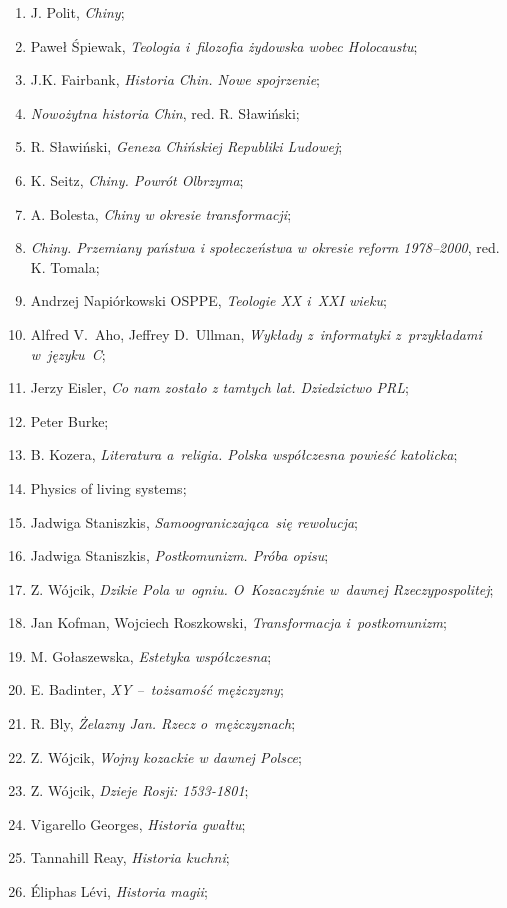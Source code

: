 \documentclass[a4paper,11pt]{article}
\begin{document}
\begin{enumerate}
\item J. Polit, \emph{Chiny};
\item Paweł Śpiewak, \emph{Teologia i~filozofia żydowska wobec
    Holocaustu};
\item J.K. Fairbank, \emph{Historia Chin. Nowe spojrzenie};
\item \emph{Nowożytna historia Chin}, red. R. Sławiński;
\item R. Sławiński, \emph{Geneza Chińskiej Republiki Ludowej};
\item K. Seitz, \emph{Chiny. Powrót Olbrzyma};
\item A. Bolesta, \emph{Chiny w okresie transformacji};
\item \emph{Chiny. Przemiany państwa i społeczeństwa w okresie reform
    1978--2000}, red. K. Tomala;
\item Andrzej Napiórkowski OSPPE, \emph{Teologie XX i~XXI wieku};
\item Alfred V.~Aho, Jeffrey D.~Ullman, \emph{Wykłady z~informatyki
    z~przykładami w~języku~C};
\item Jerzy Eisler, \emph{Co nam zostało z tamtych lat. Dziedzictwo
    PRL};
\item Peter Burke;
\item B. Kozera, \emph{Literatura a~religia. Polska współczesna
    powieść katolicka};
\item Physics of living systems;
\item Jadwiga Staniszkis, \emph{Samoograniczająca~się rewolucja};
\item Jadwiga Staniszkis, \emph{Postkomunizm. Próba opisu};
\item Z. Wójcik, \emph{Dzikie Pola w~ogniu. O~Kozaczyźnie w~dawnej
    Rzeczypospolitej};
\item Jan Kofman, Wojciech Roszkowski, \emph{Transformacja
    i~postkomunizm};
\item M. Gołaszewska, \emph{Estetyka współczesna};
\item E. Badinter, \emph{XY --~tożsamość mężczyzny};
\item R. Bly, \emph{Żelazny Jan. Rzecz o~mężczyznach};
\item Z. Wójcik, \emph{Wojny kozackie w dawnej Polsce};
\item Z. Wójcik, \emph{Dzieje Rosji: 1533-1801};
\item Vigarello Georges, \emph{Historia gwałtu};
\item Tannahill Reay, \emph{Historia kuchni};
\item Éliphas Lévi, \emph{Historia magii};

\end{enumerate}
\end{document}
